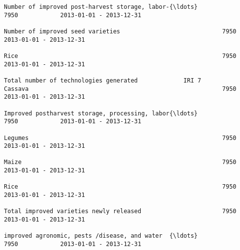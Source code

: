 \documentclass[11pt]{article}
\begin{document}
\begin{Verbatim}[commandchars=\\\{\}]
                                                                                                                                                              Number of improved post-harvest storage, labor-{\ldots}            7950            2013-01-01 - 2013-12-31   
                                                                                                                                                              Number of improved seed varieties                             7950            2013-01-01 - 2013-12-31   
                                                                                                                                                              Rice                                                          7950            2013-01-01 - 2013-12-31   
                                                                         Total number of technologies generated             IRI 7                             Cassava                                                       7950            2013-01-01 - 2013-12-31   
                                                                                                                                                              Improved postharvest storage, processing, labor{\ldots}            7950            2013-01-01 - 2013-12-31   
                                                                                                                                                              Legumes                                                       7950            2013-01-01 - 2013-12-31   
                                                                                                                                                              Maize                                                         7950            2013-01-01 - 2013-12-31   
                                                                                                                                                              Rice                                                          7950            2013-01-01 - 2013-12-31   
                                                                                                                                                              Total improved varieties newly released                       7950            2013-01-01 - 2013-12-31   
                                                                                                                                                              improved agronomic, pests /disease, and water  {\ldots}            7950            2013-01-01 - 2013-12-31   

\end{Verbatim}
\end{document}

